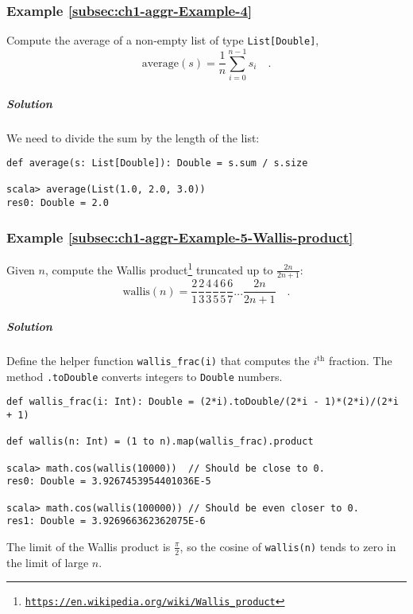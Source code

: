 \subsubsection{Example \label{subsec:ch1-aggr-Example-4}\ref{subsec:ch1-aggr-Example-4}}

Compute the average of a non-empty list of type \lstinline!List[Double]!,
\[
\text{average}\left(s\right)=\frac{1}{n}\sum_{i=0}^{n-1}s_{i}\quad.
\]


\subparagraph{Solution}

We need to divide the sum by the length of the list:
\begin{lstlisting}
def average(s: List[Double]): Double = s.sum / s.size

scala> average(List(1.0, 2.0, 3.0))
res0: Double = 2.0
\end{lstlisting}


\subsubsection{Example \label{subsec:ch1-aggr-Example-5-Wallis-product}\ref{subsec:ch1-aggr-Example-5-Wallis-product}}

Given $n$, compute the Wallis product\footnote{\texttt{\href{https://en.wikipedia.org/wiki/Wallis_product}{https://en.wikipedia.org/wiki/Wallis\_product}}}
truncated up to $\frac{2n}{2n+1}$: 
\[
\text{wallis}\left(n\right)=\frac{2}{1}\frac{2}{3}\frac{4}{3}\frac{4}{5}\frac{6}{5}\frac{6}{7}...\frac{2n}{2n+1}\quad.
\]


\subparagraph{Solution}

Define the helper function \lstinline!wallis_frac(i)! that computes
the $i^{\text{th}}$ fraction. The method \texttt{}\lstinline!.toDouble!
converts integers to \texttt{}\lstinline!Double! numbers.
\begin{lstlisting}
def wallis_frac(i: Int): Double = (2*i).toDouble/(2*i - 1)*(2*i)/(2*i + 1)

def wallis(n: Int) = (1 to n).map(wallis_frac).product

scala> math.cos(wallis(10000))  // Should be close to 0.
res0: Double = 3.9267453954401036E-5

scala> math.cos(wallis(100000)) // Should be even closer to 0.
res1: Double = 3.926966362362075E-6
\end{lstlisting}
The limit of the Wallis product is $\frac{\pi}{2}$, so the cosine
of \lstinline!wallis(n)! tends to zero in the limit of large $n$.


